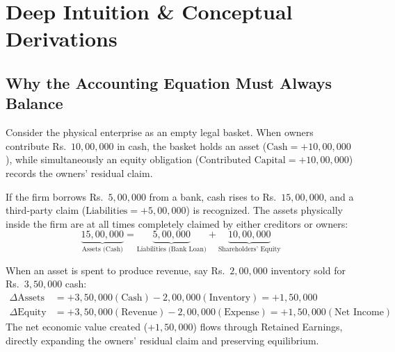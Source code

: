 \section{Deep Intuition \& Conceptual Derivations}

\subsection{Why the Accounting Equation Must Always Balance}
Consider the physical enterprise as an empty legal basket. When owners contribute Rs.~$10{,}00,000$ in cash, the basket holds an asset ($\text{Cash} = +10{,}00,000$), while simultaneously an equity obligation ($\text{Contributed Capital} = +10{,}00,000$) records the owners' residual claim. 

If the firm borrows Rs.~$5{,}00,000$ from a bank, cash rises to Rs.~$15{,}00,000$, and a third-party claim ($\text{Liabilities} = +5{,}00,000$) is recognized. The assets physically inside the firm are at all times completely claimed by either creditors or owners:
\begin{equation*}
\underbrace{15{,}00,000}_{\text{Assets (Cash)}} = \underbrace{5{,}00,000}_{\text{Liabilities (Bank Loan)}} + \underbrace{10{,}00,000}_{\text{Shareholders' Equity}}
\end{equation*}

When an asset is spent to produce revenue, say Rs.~$2{,}00,000$ inventory sold for Rs.~$3{,}50,000$ cash:
\begin{align*}
\Delta \text{Assets} &= +3{,}50,000 (\text{Cash}) - 2{,}00,000 (\text{Inventory}) = +1{,}50,000 \\
\Delta \text{Equity} &= +3{,}50,000 (\text{Revenue}) - 2{,}00,000 (\text{Expense}) = +1{,}50,000 (\text{Net Income})
\end{align*}
The net economic value created ($+1{,}50,000$) flows through Retained Earnings, directly expanding the owners' residual claim and preserving equilibrium.

